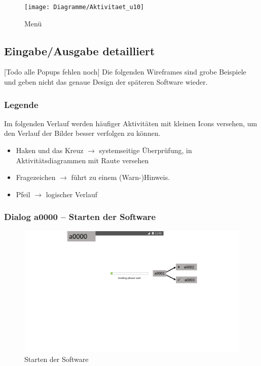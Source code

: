 \documentclass[a4paper,12pt,oneside]{scrartcl}
\begin{document}
\begin{figure}[!htbp]
\centering
\noindent\texttt{[image: Diagramme/Aktivitaet\_u10]}
\caption{Menü}
\end{figure}
\FloatBarrier


\subsection{Eingabe/Ausgabe detailliert}
[Todo alle Popups fehlen noch]
Die folgenden Wireframes sind grobe Beispiele und geben nicht das genaue Design der späteren Software wieder.

\subsubsection*{Legende}
Im folgenden Verlauf werden häufiger Aktivitäten mit kleinen Icons versehen, um den Verlauf der Bilder besser verfolgen zu können.
\begin{itemize}
	\item Haken und das Kreuz $\rightarrow$  systemseitige Überprüfung, in Aktivitätsdiagrammen mit Raute versehen
	\item Fragezeichen $\rightarrow$ führt zu einem (Warn-)Hinweis.
	\item Pfeil $\rightarrow$ logischer Verlauf
\end{itemize}

\subsubsection{Dialog a0000 – Starten der Software}
\begin{figure}[!htbp]
\centering
\noindent\includegraphics[width=\linewidth,height=\textheight,keepaspectratio]{Dialoge/a0000}
\caption{Starten der Software}
\end{figure}
\FloatBarrier
\end{document}
